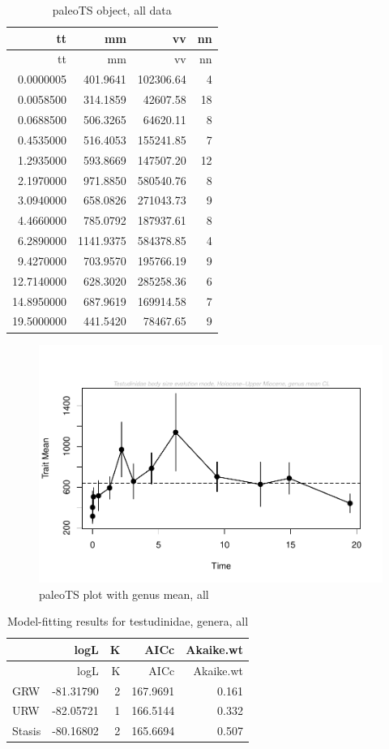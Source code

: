 \documentclass[]{article}
\begin{document}
\begin{longtable}[]{@{}rrrr@{}}
\caption{paleoTS object, all data}\tabularnewline
\toprule
tt & mm & vv & nn\tabularnewline
\midrule
\endfirsthead
\toprule
tt & mm & vv & nn\tabularnewline
\midrule
\endhead
0.0000005 & 401.9641 & 102306.64 & 4\tabularnewline
0.0058500 & 314.1859 & 42607.58 & 18\tabularnewline
0.0688500 & 506.3265 & 64620.11 & 8\tabularnewline
0.4535000 & 516.4053 & 155241.85 & 7\tabularnewline
1.2935000 & 593.8669 & 147507.20 & 12\tabularnewline
2.1970000 & 971.8850 & 580540.76 & 8\tabularnewline
3.0940000 & 658.0826 & 271043.73 & 9\tabularnewline
4.4660000 & 785.0792 & 187937.61 & 8\tabularnewline
6.2890000 & 1141.9375 & 584378.85 & 4\tabularnewline
9.4270000 & 703.9570 & 195766.19 & 9\tabularnewline
12.7140000 & 628.3020 & 285258.36 & 6\tabularnewline
14.8950000 & 687.9619 & 169914.58 & 7\tabularnewline
19.5000000 & 441.5420 & 78467.65 & 9\tabularnewline
\bottomrule
\end{longtable}

\begin{figure}[htbp]
\centering
\includegraphics{MA_JJ_files/figure-latex/paleoTSAll-1.pdf}
\caption{paleoTS plot with genus mean, all}
\end{figure}

\begin{longtable}[]{@{}lrrrr@{}}
\caption{Model-fitting results for testudinidae, genera,
all}\tabularnewline
\toprule
& logL & K & AICc & Akaike.wt\tabularnewline
\midrule
\endfirsthead
\toprule
& logL & K & AICc & Akaike.wt\tabularnewline
\midrule
\endhead
GRW & -81.31790 & 2 & 167.9691 & 0.161\tabularnewline
URW & -82.05721 & 1 & 166.5144 & 0.332\tabularnewline
Stasis & -80.16802 & 2 & 165.6694 & 0.507\tabularnewline
\bottomrule
\end{longtable}
\end{document}
